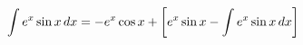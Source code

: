 \documentclass[preview]{standalone}
\begin{document}
\begin{align*}
\special{dvisvgm:raw <g id='unique000'>}\int e^x \sin x \, dx = -e^x \cos x + \left[ e^x \sin x - \int e^x \sin x \, dx \right]\special{dvisvgm:raw </g>}
\end{align*}
\end{document}
